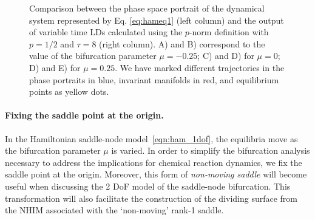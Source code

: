 \documentclass{ws-ijbc}
\begin{document}
\begin{figure}[htbp]
\begin{center}
	\end{center}
	\caption{Comparison between the phase space portrait of the dynamical system represented by Eq. \eqref{eq:hameq1} (left column) and the output of variable time LDs calculated using the $p$-norm definition with $p = 1/2$ and $\tau = 8$ (right column). A) and B) correspond to the value of the bifurcation parameter $\mu = -0.25$; C) and D) for $\mu = 0$; D) and E) for $\mu = 0.25$. We have marked  different trajectories in the phase portraits in blue, invariant manifolds in red, and equilibrium points as yellow dots.}
	\label{ld_bif_sn}
\end{figure}


\paragraph{Fixing the saddle point at the origin.}
In the Hamiltonian saddle-node model~\eqref{eqn:ham_1dof}, the equilibria move as the bifurcation parameter $\mu$ is varied. In order to simplify the bifurcation analysis necessary to address the implications for chemical reaction dynamics, we fix the saddle point at the origin. Moreover, this form of \textit{non-moving saddle} will become useful when discussing the 2 DoF model of the saddle-node bifurcation. This transformation will also facilitate the construction of the dividing surface from the NHIM associated with the `non-moving' rank-1 saddle. 
\end{document}
